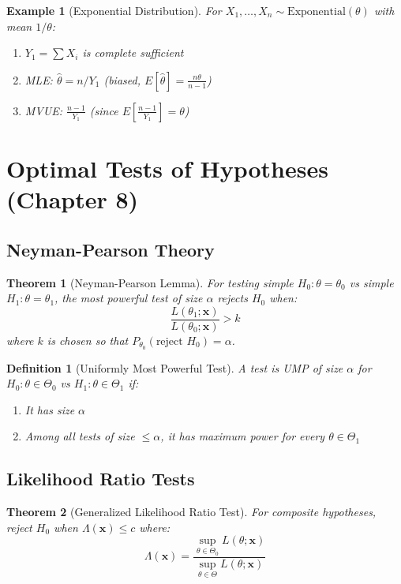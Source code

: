 \documentclass[12pt,a4paper]{amsart}
\newtheorem{theorem}{Theorem}[section]
\newtheorem{definition}{Definition}[section]
\newtheorem{example}{Example}[section]
\theoremstyle{remark}
\begin{document}
\begin{example}[Exponential Distribution]
For $X_1, \ldots, X_n \sim \text{Exponential}(\theta)$ with mean $1/\theta$:
\begin{enumerate}
\item $Y_1 = \sum X_i$ is complete sufficient
\item MLE: $\hat{\theta} = n/Y_1$ (biased, $E[\hat{\theta}] = \frac{n\theta}{n-1}$)
\item MVUE: $\frac{n-1}{Y_1}$ (since $E[\frac{n-1}{Y_1}] = \theta$)
\end{enumerate}
\end{example}

\section{Optimal Tests of Hypotheses (Chapter 8)}

\subsection{Neyman-Pearson Theory}

\begin{theorem}[Neyman-Pearson Lemma]
For testing simple $H_0: \theta = \theta_0$ vs simple $H_1: \theta = \theta_1$, the most powerful test of size $\alpha$ rejects $H_0$ when:
$$\frac{L(\theta_1; \mathbf{x})}{L(\theta_0; \mathbf{x})} > k$$
where $k$ is chosen so that $P_{\theta_0}(\text{reject } H_0) = \alpha$.
\end{theorem}

\begin{definition}[Uniformly Most Powerful Test]
A test is UMP of size $\alpha$ for $H_0: \theta \in \Theta_0$ vs $H_1: \theta \in \Theta_1$ if:
\begin{enumerate}
\item It has size $\alpha$
\item Among all tests of size $\leq \alpha$, it has maximum power for every $\theta \in \Theta_1$
\end{enumerate}
\end{definition}

\subsection{Likelihood Ratio Tests}

\begin{theorem}[Generalized Likelihood Ratio Test]
For composite hypotheses, reject $H_0$ when $\Lambda(\mathbf{x}) \leq c$ where:
$$\Lambda(\mathbf{x}) = \frac{\sup_{\theta \in \Theta_0} L(\theta; \mathbf{x})}{\sup_{\theta \in \Theta} L(\theta; \mathbf{x})}$$
\end{theorem}
\end{document}
